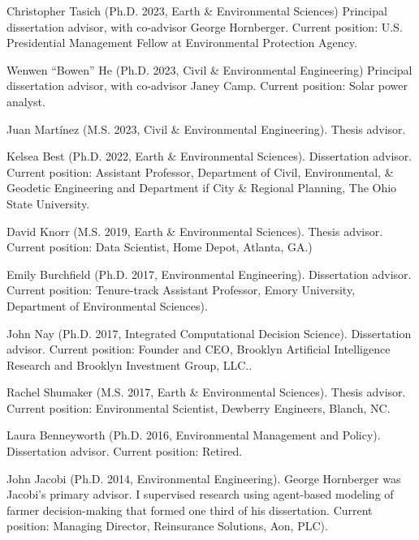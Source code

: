 \item Christopher Tasich (Ph.D. 2023, Earth \& Environmental Sciences) Principal  
  dissertation advisor, with co-advisor George Hornberger.
  Current position: U.S. Presidential Management Fellow at Environmental Protection Agency.
\item Wenwen ``Bowen'' He (Ph.D. 2023, Civil \& Environmental Engineering) 
  Principal dissertation advisor, with co-advisor Janey Camp.
  Current position: Solar power analyst.
\item Juan Mart\'inez (M.S. 2023, Civil \& Environmental Engineering).
  Thesis advisor.
\item Kelsea Best (Ph.D. 2022, Earth \& Environmental Sciences).
  Dissertation advisor.
  Current position: Assistant Professor, Department of Civil, Environmental, \& Geodetic
  Engineering and Department if City \& Regional Planning,
  The Ohio State University.
\item David Knorr (M.S. 2019, Earth \& Environmental Sciences).
  Thesis advisor.
  Current position: Data Scientist, Home Depot, Atlanta, GA.)
\item Emily Burchfield (Ph.D. 2017, Environmental Engineering).
  Dissertation advisor.
  Current position: Tenure-track Assistant Professor, Emory University, Department of Environmental Sciences).
\item John Nay (Ph.D. 2017, Integrated Computational Decision Science).
  Dissertation advisor.
  Current position: Founder and CEO, Brooklyn Artificial Intelligence Research and Brooklyn Investment Group, LLC..
\item Rachel Shumaker (M.S. 2017, Earth \& Environmental Sciences).
  Thesis advisor.
  Current position: Environmental Scientist, Dewberry Engineers, Blanch, NC.
\item Laura Benneyworth (Ph.D. 2016, Environmental Management and Policy).
  Dissertation advisor.
  Current position: Retired.
\item John Jacobi (Ph.D. 2014, Environmental Engineering).
  George Hornberger was Jacobi's primary advisor.
  I supervised research using agent-based modeling of farmer decision-making that formed one third of his dissertation.
  Current position: Managing Director, Reinsurance Solutions, Aon, PLC).

